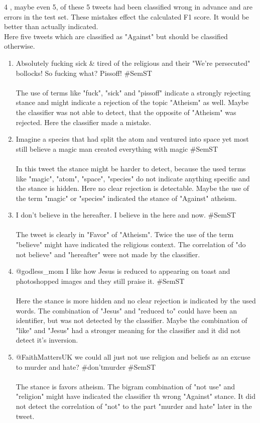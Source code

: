 \documentclass[a4paper,12pt,twoside]{article}
\begin{document}
4 , maybe even 5, of these 5 tweets had been classified wrong in advance and are errors in the test set. These mistakes effect the calculated F1 score. It would be better than actually indicated.\\
Here five tweets which are classified as "Against" but should be classified otherwise.
\\
\begin{enumerate}
\item Absolutely fucking sick \& tired of the religious and their "We're persecuted" bollocks! So fucking what? Pissoff! \#SemST\\
\\
The use of terms like "fuck", "sick" and "pissoff" indicate a strongly rejecting stance and might indicate a rejection of the topic "Atheism" as well. Maybe the classifier was not able to detect, that the opposite of "Atheism" was rejected. Here the classifier made a mistake. 
\\
\item Imagine a species that had split the atom and ventured into space yet most still believe a magic man created everything with magic \#SemST\\
\\
In this tweet the stance might be harder to detect, because the used terms like "magic", "atom", "space", "species" do not indicate anything specific and the stance is hidden. Here no clear rejection is detectable. Maybe the use of the term "magic" or "species" indicated the stance of "Against" atheism. 
\\
\item I don't believe in the hereafter.  I believe in the here and now. \#SemST\\
\\
The tweet is clearly in "Favor" of "Atheism". Twice the use of the term "believe" might have indicated the religious context. The correlation of "do not believe" and "hereafter" were not made by the classifier.
\\
\item @godless\_mom I like how Jesus is reduced to appearing on toast and photoshopped images and they still praise it. \#SemST \\
\\
Here the stance is more hidden and no clear rejection is indicated by the used words. The combination of "Jesus" and "reduced to" could have been an identifier, but was not detected by the classifier. Maybe the combination of "like" and "Jesus" had a stronger meaning for the classifier and it did not detect it's inversion.
\\
\item @FaithMattersUK we could all just not use religion and beliefs as an excuse to murder and hate? \#don'tmurder \#SemST\\
\\
The stance is favors atheism. The bigram combination of "not use" and "religion" might have indicated the classifier th wrong "Against" stance. It did not detect the correlation of "not" to the part "murder and hate" later in the tweet.
\\
\end{enumerate} 
\end{document}
